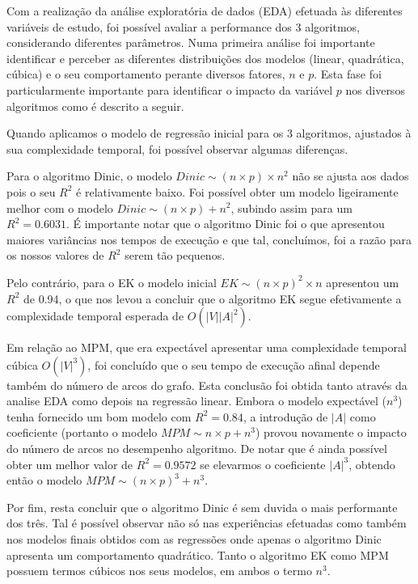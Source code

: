 \documentclass{uofa-eng-assignment}
\begin{document}
Com a realização da análise exploratória de dados (EDA) efetuada às diferentes variáveis de estudo, foi possível avaliar a performance dos 3 algoritmos, considerando diferentes parâmetros. 
Numa primeira análise foi importante identificar e perceber as diferentes distribuições dos modelos (linear, quadrática, cúbica)  e o seu comportamento perante diversos fatores, $n$ e $p$.
Esta fase foi particularmente importante para identificar o impacto da variável $p$ nos diversos algoritmos como é descrito a seguir.

Quando aplicamos o modelo de regressão inicial para os 3 algoritmos, ajustados à sua complexidade temporal, foi possível observar algumas diferenças. 

Para o algoritmo Dinic, o modelo $Dinic \sim (n \times p) \times n^2$ não se ajusta aos dados pois o seu $R^2$ é relativamente baixo. Foi possível obter um modelo ligeiramente melhor com o modelo $Dinic \sim (n \times p) + n^2$, subindo assim para um $R^2 = 0.6031$. É importante notar que o algoritmo Dinic foi o que apresentou maiores variâncias nos tempos de execução e que tal, concluímos, foi a razão para os nossos valores de $R^2$ serem tão pequenos.

Pelo contrário, para o EK o modelo inicial $EK \sim (n \times p)^2 \times n$ apresentou um $R^2$ de 0.94, o que nos levou a concluir que o algoritmo EK segue efetivamente a complexidade temporal esperada de $O(|V||A|^2)$.

Em relação ao MPM, que era expectável apresentar uma complexidade temporal cúbica $O(|V|^3)$, foi concluído que o seu tempo de execução afinal depende também do número de arcos do grafo. Esta conclusão foi obtida tanto através da analise EDA como depois na regressão linear. Embora o modelo expectável ($n^3$) tenha fornecido um bom modelo com $R^2=0.84$, a introdução de $|A|$ como coeficiente (portanto o modelo $MPM \sim n\times p + n^3$) provou novamente o impacto do número de arcos no desempenho algoritmo. De notar que é ainda possível obter um melhor valor de $R^2=0.9572$ se elevarmos o coeficiente $|A|^3$, obtendo então o modelo $MPM \sim (n\times p)^3 + n^3$.

Por fim, resta concluir que o algoritmo Dinic é sem duvida o mais performante dos três. Tal é possível observar não só nas experiências efetuadas como também nos modelos finais obtidos com as regressões onde apenas o algoritmo Dinic apresenta um comportamento quadrático. Tanto o algoritmo EK como MPM possuem termos cúbicos nos seus modelos, em ambos o termo $n^3$.
\end{document}
